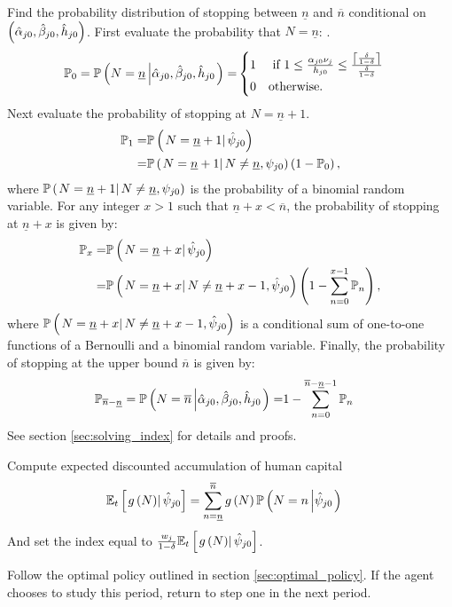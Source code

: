 \begin{outline}
\item Find the probability distribution of stopping between $\underline{n}$ and $\overline{n}$ conditional on $\left( \hat{\alpha}_{j0}, \hat{\beta}_{j0}, \hat{h}_{j0} \right)$.
First evaluate the probability that $N = \underline{n}$:
.\begin{align*}
    \mathbb{P}_0 = \mathbb{P} \left( 
        N = \underline{n}
     \left\vert \hat{\alpha}_{j0}, \hat{\beta}_{j0}, \hat{h}_{j0} \right. \right)
    =&
    \begin{cases}
    1 &\text{ if } 1 \leq \frac{\alpha_{j0} \nu_j}{h_{j0}} \leq \frac{\left\lceil \frac{\delta}{1 - \delta} \right\rceil}{\frac{\delta}{1 - \delta}}
    \\
    0 &\text{otherwise}.
    \end{cases}
\end{align*}
Next evaluate the probability of stopping at $N = \underline{n} + 1$.
\begin{align*}
    \mathbb{P}_1 
    =&
    \mathbb{P} \left( \left. N = \underline{n} + 1 \right\vert \hat{\psi}_{j0} \right)
    \\
    =&
    \mathbb{P} \left( \left. N = \underline{n} + 1 \right\vert N \neq \underline{n}, \psi_{j0} \right) 
    \left( 1 - \mathbb{P}_0 \right),
\end{align*}
where $\mathbb{P} \left( \left. N = \underline{n} + 1 \right\vert N \neq \underline{n}, \psi_{j0} \right)$ is the probability of a binomial random variable.
For any integer $x > 1$ such that $\underline{n} + x < \overline{n}$, the probability of stopping at $\underline{n} + x$ is given by:
\begin{align*}
    \mathbb{P}_x
    =&
    \mathbb{P} \left( \left. N = \underline{n} + x \right\vert \hat{\psi}_{j0} \right)
    \\
    =&
    \mathbb{P} \left( \left. N = \underline{n} + x \right\vert N \neq \underline{n} + x - 1, \hat{\psi}_{j0} \right)
    \left( 1 - \sum_{n = 0}^{x - 1} \mathbb{P}_n \right),
\end{align*}
where $\mathbb{P} \left( \left. N = \underline{n} + x \right\vert N \neq \underline{n} + x - 1, \hat{\psi}_{j0} \right)$
is a conditional sum of one-to-one functions of a Bernoulli and a binomial random variable. 
Finally, the probability of stopping at the upper bound $\overline{n}$ is given by:
\begin{align*}
    \mathbb{P}_{\overline{n} - \underline{n}} = \mathbb{P} \left( 
        N = \overline{n}
     \left\vert \hat{\alpha}_{j0}, \hat{\beta}_{j0}, \hat{h}_{j0} \right. \right)
    =&
    1 - \sum_{n = 0}^{\overline{n} - \underline{n} - 1} \mathbb{P}_n
\end{align*}
See section \ref{sec:solving_index} for details and proofs. 

\item Compute expected discounted accumulation of human capital
\begin{align*}
    \mathbb{E}_t \left[\left. 
        g\left( N \right)
     \right\vert \hat{\psi}_{j0} \right] 
    &=
    \sum_{n = \underline{n}}^{\overline{n}}
    g\left( N \right)
    \mathbb{P}
    \left( 
        N = n
     \left\vert \hat{\psi}_{j0} \right.
     \right)
\end{align*}
And set the index equal to $\frac{w_j}{1 - \delta} \mathbb{E}_t \left[\left. g\left( N \right) \right\vert \hat{\psi}_{j0} \right] $.

\item Follow the optimal policy outlined in section \ref{sec:optimal_policy}. If the agent chooses to study this period, return to step one in the next period. 

\end{outline}
